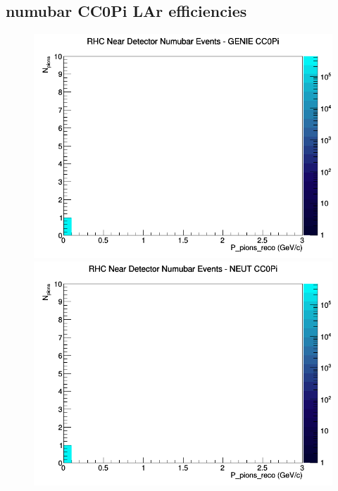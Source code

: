 \documentclass[12pt]{article}
\begin{document}
\subsection{numubar CC0Pi LAr efficiencies}
\begin{figure}[h]
\includegraphics[width=\linewidth]{eff_N_P/LAr/pions/CC0Pi_RHC_ND_numubar_N_P_GENIE.png}
\endminipage
{}
\includegraphics[width=\linewidth]{eff_N_P/LAr/pions/CC0Pi_RHC_ND_numubar_N_P_NEUT.png}
\endminipage
{}

\end{figure}
\end{document}
